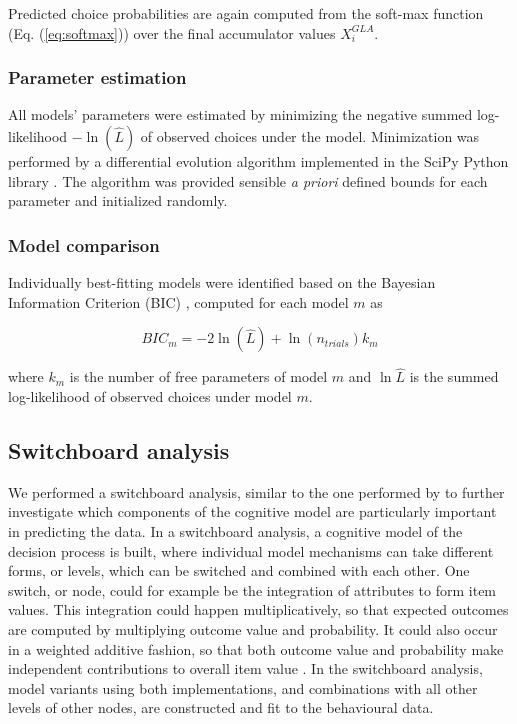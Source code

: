 \documentclass[11pt, a4paper]{article}
\begin{document}
Predicted choice probabilities are again computed from the soft-max function (Eq. (\ref{eq:softmax})) over the final accumulator values $X_i^{GLA}$.

\subsubsection*{Parameter estimation}

All models' parameters were estimated by minimizing the negative summed log-likelihood $-\ln{(\hat{L})}$ of observed choices under the model. Minimization was performed by a differential evolution algorithm \autocite{storn1997DifferentialEvolutionSimple} implemented in the SciPy Python library \autocite{jones2001SciPyOpenSource}. The algorithm was provided sensible \emph{a priori} defined bounds for each parameter and initialized randomly.

\subsubsection*{Model comparison}

Individually best-fitting models were identified based on the Bayesian Information Criterion (BIC) \autocite{schwarz1978EstimatingDimensionModel}, computed for each model $m$ as

\begin{equation}
    \label{eq:bic}
    BIC_m = -2 \ln{(\hat{L})} + \ln{(n_{trials})} k_m
\end{equation}

where $k_m$ is the number of free parameters of model $m$ and $\ln{\hat{L}}$ is the summed log-likelihood of observed choices under model $m$.

\subsection*{Switchboard analysis}
\label{sec:methods:switchboard}

We performed a switchboard analysis, similar to the one performed by \citeauthor{turner2018CompetingTheoriesMultialternative} \autocite{turner2018CompetingTheoriesMultialternative} to further investigate which components of the cognitive model are particularly important in predicting the data. In a switchboard analysis, a cognitive model of the decision process is built, where individual model mechanisms can take different forms, or levels, which can be switched and combined with each other. One switch, or node, could for example be the integration of attributes to form item values. This integration could happen multiplicatively, so that expected outcomes are computed by multiplying outcome value and probability. It could also occur in a weighted additive fashion, so that both outcome value and probability make independent contributions to overall item value \autocite{rouault2019PrefrontalMechanismsCombining}. In the switchboard analysis, model variants using both implementations, and combinations with all other levels of other nodes, are constructed and fit to the behavioural data.
\end{document}

